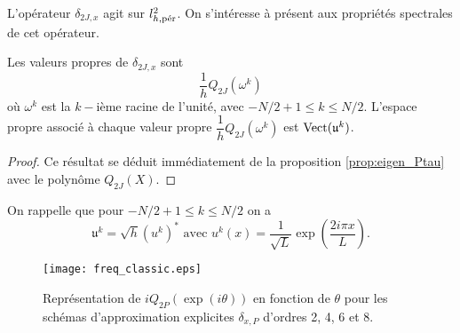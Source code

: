 L'opérateur $\delta_{2J,x}$ agit sur $l^2_{h,\per}$. On s'intéresse à présent aux propriétés spectrales de cet opérateur.
\begin{proposition}
Les valeurs propres de $\delta_{2J,x}$ sont
\begin{equation}
\dfrac{1}{h}Q_{2J}(\omega^k)
\end{equation}
où $\omega^k$ est la $k-$ième racine de l'unité, avec $-N/2+1 \leq k \leq N/2$. L'espace propre associé à chaque valeur propre $\dfrac{1}{h}Q_{2J}(\omega^k)$ est $\Vect ( \mathfrak{u}^k )$.
\end{proposition}

\begin{proof}
Ce résultat se déduit immédiatement de la proposition \ref{prop:eigen_Ptau} avec le polynôme $Q_{2J}(X)$.
\end{proof}

On rappelle que pour $-N/2+1 \leq k \leq N/2$ on a
\begin{equation}
\mathfrak{u}^k = \sqrt{h}(u^k)^* \text{ avec } u^k(x) = \dfrac{1}{\sqrt{L}} \exp \left( \dfrac{2 i \pi x}{L} \right).
\end{equation}














\begin{figure}[htbp]
\begin{center}
\texttt{[image: freq\_classic.eps]}
\end{center}
\caption{Représentation de $i Q_{2P}\left( \exp(i \theta) \right)$ en fonction de $\theta$ pour les schémas d'approximation explicites $\delta_{x,P}$ d'ordres 2, 4, 6 et 8.}
\label{fig:freq_classic}
\end{figure}


